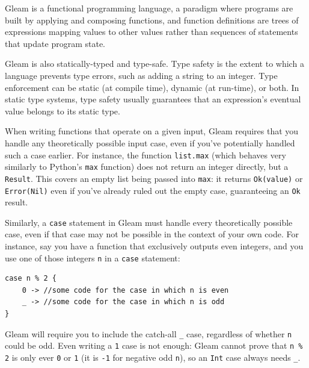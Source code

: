 \begin{blocksection}
Gleam is a functional programming language, a paradigm where programs are built
by applying and composing functions, and function definitions are trees of
expressions mapping values to other values rather than sequences of statements
that update program state.

Gleam is also statically-typed and type-safe. Type safety is the extent to which
a language prevents type errors, such as adding a string to an integer. Type
enforcement can be static (at compile time), dynamic (at run-time), or both. In
static type systems, type safety usually guarantees that an expression's
eventual value belongs to its static type.

When writing functions that operate on a given input, Gleam requires that you
handle any theoretically possible input case, even if you've potentially handled
such a case earlier. For instance, the function \texttt{list.max} (which behaves
very similarly to Python's \texttt{max} function) does not return an integer
directly, but a \texttt{Result}. This covers an empty list being passed into \texttt{max}: it returns
\texttt{Ok(value)} or \texttt{Error(Nil)} even if you've already ruled out the
empty case, guaranteeing an \texttt{Ok} result.

Similarly, a \texttt{case} statement in Gleam must handle every theoretically possible case, 
even if that case may not be possible in the context
of your own code. For instance, say you have a function that exclusively outputs
even integers, and you use one of those integers \texttt{n} in a \texttt{case}
statement:
\begin{lstlisting}
case n % 2 {
    0 -> //some code for the case in which n is even
    _ -> //some code for the case in which n is odd
}
\end{lstlisting}
Gleam will require you to include the catch-all \texttt{\_} case, regardless of
whether \texttt{n} could be odd. Even writing a \texttt{1} case is not enough:
Gleam cannot prove that \texttt{n \% 2} is only ever \texttt{0} or \texttt{1}
(it is \texttt{-1} for negative odd \texttt{n}), so an \texttt{Int} case always needs \texttt{\_}.
\newline
\end{blocksection}